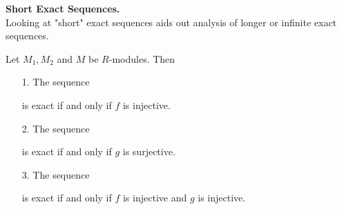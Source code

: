 \noindent \textbf{Short Exact Sequences.}\\
Looking at "short" exact sequences aids out analysis of longer or
infinite exact sequences. 
\begin{proposition}
    Let $M_1, M_2$ and $M$ be $R$-modules. Then
    \begin{itemize}
        \item[1.] The sequence
        is exact if and only if $f$ is injective.

        \item[2.] The sequence
        is exact if and only if $g$ is surjective. 

        \item[3.] 
        The sequence
         is exact if and only if $f$ is injective
            and $g$ is injective.
    \end{itemize}
\end{proposition}

